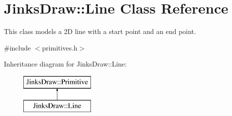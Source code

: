 \hypertarget{class_jinks_draw_1_1_line}{}\section{Jinks\+Draw\+:\+:Line Class Reference}
\label{class_jinks_draw_1_1_line}


This class models a 2D line with a start point and an end point.  




{\ttfamily \#include $<$primitives.\+h$>$}

Inheritance diagram for Jinks\+Draw\+:\+:Line\+:\begin{figure}[H]
\begin{center}
\leavevmode
\includegraphics[height=2.000000cm]{class_jinks_draw_1_1_line}
\end{center}
\end{figure}
